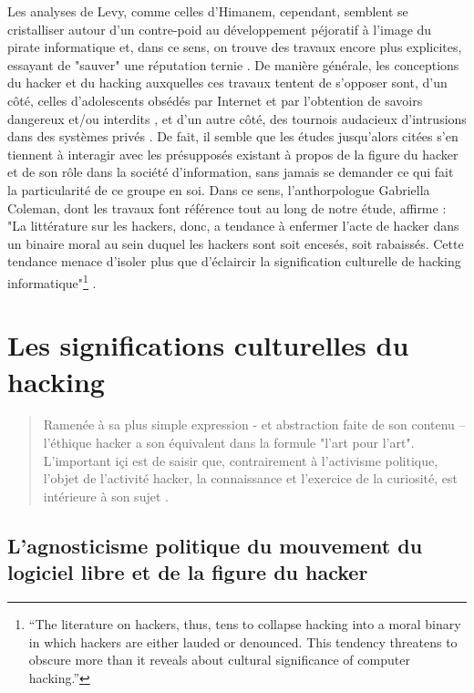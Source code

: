 Les analyses de Levy, comme celles d'Himanem, cependant, semblent se cristalliser autour d'un contre-poid au développement péjoratif à l'image du pirate informatique et, dans ce sens, on trouve des travaux encore plus explicites, essayant de "sauver" une réputation ternie \citep{Best2003a, Hannemyr1999}. De manière générale, les conceptions du hacker et du hacking auxquelles ces travaux tentent de s'opposer sont, d'un côté, celles d'adolescents obsédés par Internet et par l'obtention de savoirs dangereux et/ou interdits \citep{Borsook2001, Slatalla+Quittner1996}, et d'un autre côté, des tournois audacieux d'intrusions dans des systèmes privés \citep{Schwartau2000}. De fait, il semble que les études jusqu'alors citées s'en tiennent à interagir avec les présupposés existant à propos de la figure du hacker et de son rôle dans la société d'information, sans jamais se demander ce qui fait la particularité de ce groupe en soi. Dans ce sens, l'anthorpologue Gabriella Coleman, dont les travaux font référence tout au long de notre étude, affirme : "La littérature sur les hackers, donc, a tendance à enfermer l'acte de hacker dans un binaire moral au sein duquel les hackers sont soit encesés, soit rabaissés. Cette tendance menace d'isoler plus que d'éclaircir la signification culturelle de hacking informatique"\footnote{“The literature  on hackers, thus, tens to collapse hacking into a moral binary in which hackers are either lauded or denounced. This tendency threatens to obscure more than it reveals about cultural significance of computer hacking.”} \citep[p.256]{Coleman+Golub2008}.

\section{Les significations culturelles du hacking} \label{2.2}

\begin{quote}
Ramenée à sa plus simple expression - et abstraction faite de son contenu – l'éthique hacker a son équivalent dans la formule "l'art pour l'art". L'important içi est de saisir que, contrairement à l'activisme politique, l'objet de l'activité hacker, la connaissance et l'exercice de la curiosité, est intérieure à son sujet \citep{Reimens2002}.
\end{quote}

\subsection{L'agnosticisme politique du mouvement du logiciel libre et de la figure du hacker} \label{2.2.1}

